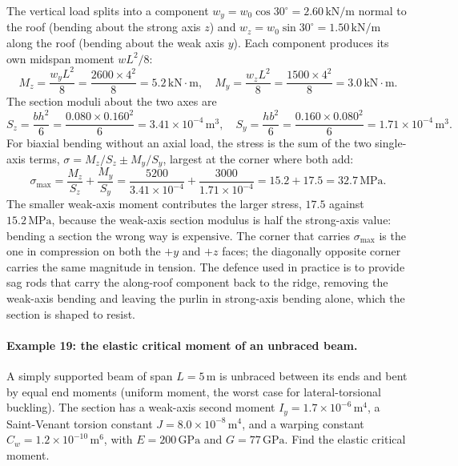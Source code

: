 The vertical load splits into a component $w_y = w_0\cos 30^{\circ} =
2.60\,\text{kN}/\text{m}$ normal to the roof (bending about the strong
axis $z$) and $w_z = w_0\sin 30^{\circ} = 1.50\,\text{kN}/\text{m}$ along
the roof (bending about the weak axis $y$). Each component produces its own
midspan moment $w L^2/8$:
\[
M_z = \frac{w_y L^2}{8} = \frac{2600 \times 4^2}{8} = 5.2\,\text{kN}
\cdot\text{m}, \quad
M_y = \frac{w_z L^2}{8} = \frac{1500 \times 4^2}{8} = 3.0\,\text{kN}
\cdot\text{m}.
\]
The section moduli about the two axes are
\[
S_z = \frac{b h^2}{6} = \frac{0.080 \times 0.160^2}{6} = 3.41 \times
10^{-4}\,\si{\meter\cubed}, \quad
S_y = \frac{h b^2}{6} = \frac{0.160 \times 0.080^2}{6} = 1.71 \times
10^{-4}\,\si{\meter\cubed}.
\]
For biaxial bending without an axial load, the stress is the sum of the
two single-axis terms, $\sigma = M_z/S_z \pm M_y/S_y$, largest at the
corner where both add:
\[
\sigma_{\max} = \frac{M_z}{S_z} + \frac{M_y}{S_y}
= \frac{5200}{3.41 \times 10^{-4}} + \frac{3000}{1.71 \times 10^{-4}}
= 15.2 + 17.5 = 32.7\,\text{MPa}.
\]
The smaller weak-axis moment contributes the larger stress, $17.5$ against
$15.2\,\text{MPa}$, because the weak-axis section modulus is half the
strong-axis value: bending a section the wrong way is expensive. The
corner that carries $\sigma_{\max}$ is the one in compression on both the
$+y$ and $+z$ faces; the diagonally opposite corner carries the same
magnitude in tension. The defence used in practice is to provide sag rods
that carry the along-roof component back to the ridge, removing the
weak-axis bending and leaving the purlin in strong-axis bending alone,
which the section is shaped to resist.

\paragraph{Example 19: the elastic critical moment of an unbraced beam.}
A simply supported beam of span $L = 5\,\si{\meter}$ is unbraced between
its ends and bent by equal end moments (uniform moment, the worst case for
lateral-torsional buckling). The section has a weak-axis second moment
$I_y = 1.7 \times 10^{-6}\,\si{\meter\tothe{4}}$, a Saint-Venant torsion
constant $J = 8.0 \times 10^{-8}\,\si{\meter\tothe{4}}$, and a warping
constant $C_w = 1.2 \times 10^{-10}\,\si{\meter\tothe{6}}$, with $E = 200\,
\text{GPa}$ and $G = 77\,\text{GPa}$. Find the elastic critical moment.

